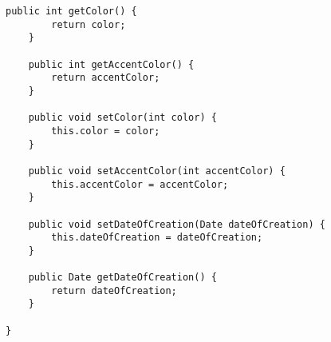 \begin{figure}[H]
\begin{lstlisting}[caption=TEN (Joscha Nassenstein)]
    public int getColor() {
        return color;
    }

    public int getAccentColor() {
        return accentColor;
    }

    public void setColor(int color) {
        this.color = color;
    }

    public void setAccentColor(int accentColor) {
        this.accentColor = accentColor;
    }

    public void setDateOfCreation(Date dateOfCreation) {
        this.dateOfCreation = dateOfCreation;
    }

    public Date getDateOfCreation() {
        return dateOfCreation;
    }

}
\end{lstlisting}
\end{figure}


